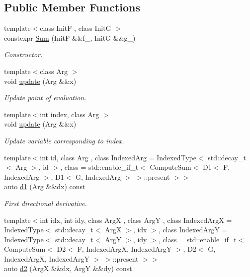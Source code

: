 \subsection*{Public Member Functions}
\begin{DoxyCompactItemize}
\item 
{\footnotesize template$<$class InitF , class InitG $>$ }\\constexpr \hyperlink{structFunG_1_1MathematicalOperations_1_1Sum_a273a3996fc22e4a41d0fba9269a99c96}{Sum} (InitF \&\&f\+\_\+, InitG \&\&g\+\_\+)
\begin{DoxyCompactList}\small\item\em Constructor. \end{DoxyCompactList}\item 
{\footnotesize template$<$class Arg $>$ }\\void \hyperlink{structFunG_1_1MathematicalOperations_1_1Sum_a15985be13a1838d868d2adce8e4f5402}{update} (Arg \&\&x)
\begin{DoxyCompactList}\small\item\em Update point of evaluation. \end{DoxyCompactList}\item 
{\footnotesize template$<$int index, class Arg $>$ }\\void \hyperlink{structFunG_1_1MathematicalOperations_1_1Sum_a4e10622e11a29d739f0d4db364980f9a}{update} (Arg \&\&x)
\begin{DoxyCompactList}\small\item\em Update variable corresponding to index. \end{DoxyCompactList}\item 
{\footnotesize template$<$int id, class Arg , class Indexed\+Arg  = Indexed\+Type$<$ std\+::decay\+\_\+t$<$ Arg $>$, id $>$, class  = std\+::enable\+\_\+if\+\_\+t$<$                           Compute\+Sum$<$ D1$<$ F, Indexed\+Arg $>$, D1$<$ G, Indexed\+Arg $>$ $>$\+::present $>$$>$ }\\auto \hyperlink{structFunG_1_1MathematicalOperations_1_1Sum_aee8c204769ab30f5ae68f9a8b0fa9bf8}{d1} (Arg \&\&dx) const 
\begin{DoxyCompactList}\small\item\em First directional derivative. \end{DoxyCompactList}\item 
{\footnotesize template$<$int idx, int idy, class ArgX , class ArgY , class Indexed\+ArgX  = Indexed\+Type$<$ std\+::decay\+\_\+t$<$ Arg\+X $>$, idx $>$, class Indexed\+ArgY  = Indexed\+Type$<$ std\+::decay\+\_\+t$<$ Arg\+Y $>$, idy $>$, class  = std\+::enable\+\_\+if\+\_\+t$<$                           Compute\+Sum$<$ D2$<$ F, Indexed\+Arg\+X, Indexed\+Arg\+Y $>$,                                       D2$<$ G, Indexed\+Arg\+X, Indexed\+Arg\+Y $>$ $>$\+::present $>$$>$ }\\auto \hyperlink{structFunG_1_1MathematicalOperations_1_1Sum_a2852f378176e93564ad85fa39331e21d}{d2} (ArgX \&\&dx, ArgY \&\&dy) const 

\end{DoxyCompactItemize}
